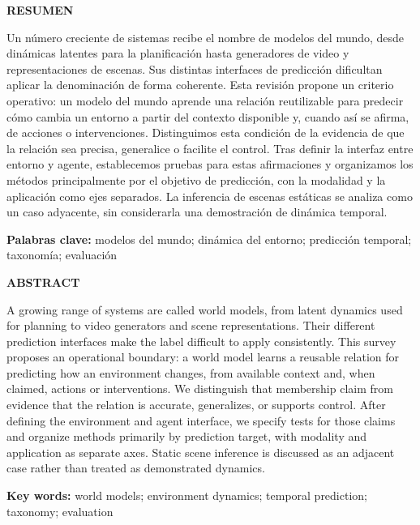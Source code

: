 \IfFileExists{IEEEtran.cls}{\documentclass[journal]{IEEEtran}}{\documentclass[twocolumn]{article}}
\begin{document}
\begin{center}
\textbf{\fontsize{14}{16}\selectfont RESUMEN}\\
\vspace{10pt}
\end{center}
\fontsize{12}{14}\selectfont 
{
\setlength{\parindent}{3em}
\hspace{1pt}
Un número creciente de sistemas recibe el nombre de modelos del mundo, desde dinámicas latentes para la planificación hasta generadores de video y representaciones de escenas. Sus distintas interfaces de predicción dificultan aplicar la denominación de forma coherente. Esta revisión propone un criterio operativo: un modelo del mundo aprende una relación reutilizable para predecir cómo cambia un entorno a partir del contexto disponible y, cuando así se afirma, de acciones o intervenciones. Distinguimos esta condición de la evidencia de que la relación sea precisa, generalice o facilite el control. Tras definir la interfaz entre entorno y agente, establecemos pruebas para estas afirmaciones y organizamos los métodos principalmente por el objetivo de predicción, con la modalidad y la aplicación como ejes separados. La inferencia de escenas estáticas se analiza como un caso adyacente, sin considerarla una demostración de dinámica temporal.\\
}
\vspace{10pt}
\begin{center}  
\textbf{\fontsize{12}{14}\selectfont Palabras clave:} modelos del mundo; dinámica del entorno; predicción temporal; taxonomía; evaluación
\end{center}

\newpage

\begin{center}
\textbf{\fontsize{14}{16}\selectfont ABSTRACT}\\
\end{center}
\vspace{10pt}
\fontsize{12}{14}\selectfont 
{
\setlength{\parindent}{3em}
\hspace{1pt}
A growing range of systems are called world models, from latent dynamics used for planning to video generators and scene representations. Their different prediction interfaces make the label difficult to apply consistently. This survey proposes an operational boundary: a world model learns a reusable relation for predicting how an environment changes, from available context and, when claimed, actions or interventions. We distinguish that membership claim from evidence that the relation is accurate, generalizes, or supports control. After defining the environment and agent interface, we specify tests for those claims and organize methods primarily by prediction target, with modality and application as separate axes. Static scene inference is discussed as an adjacent case rather than treated as demonstrated dynamics.\\

}
\vspace{10pt}
\begin{center}
\textbf{\fontsize{12}{14}\selectfont Key words:} world models; environment dynamics; temporal prediction; taxonomy; evaluation
\end{center}
\end{document}
